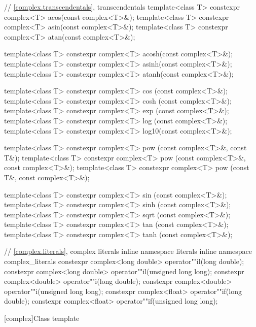\begin{codeblock}
{  // \ref{complex.transcendentals}, transcendentals
  template<class T> constexpr complex<T> acos(const complex<T>&);
  template<class T> constexpr complex<T> asin(const complex<T>&);
  template<class T> constexpr complex<T> atan(const complex<T>&);

  template<class T> constexpr complex<T> acosh(const complex<T>&);
  template<class T> constexpr complex<T> asinh(const complex<T>&);
  template<class T> constexpr complex<T> atanh(const complex<T>&);

  template<class T> constexpr complex<T> cos  (const complex<T>&);
  template<class T> constexpr complex<T> cosh (const complex<T>&);
  template<class T> constexpr complex<T> exp  (const complex<T>&);
  template<class T> constexpr complex<T> log  (const complex<T>&);
  template<class T> constexpr complex<T> log10(const complex<T>&);

  template<class T> constexpr complex<T> pow  (const complex<T>&, const T&);
  template<class T> constexpr complex<T> pow  (const complex<T>&, const complex<T>&);
  template<class T> constexpr complex<T> pow  (const T&, const complex<T>&);

  template<class T> constexpr complex<T> sin  (const complex<T>&);
  template<class T> constexpr complex<T> sinh (const complex<T>&);
  template<class T> constexpr complex<T> sqrt (const complex<T>&);
  template<class T> constexpr complex<T> tan  (const complex<T>&);
  template<class T> constexpr complex<T> tanh (const complex<T>&);

  // \ref{complex.literals}, complex literals
  inline namespace literals {
  inline namespace complex_literals {
    constexpr complex<long double> operator""il(long double);
    constexpr complex<long double> operator""il(unsigned long long);
    constexpr complex<double> operator""i(long double);
    constexpr complex<double> operator""i(unsigned long long);
    constexpr complex<float> operator""if(long double);
    constexpr complex<float> operator""if(unsigned long long);
  }
  }
}
\end{codeblock}

[complex]{Class template }

